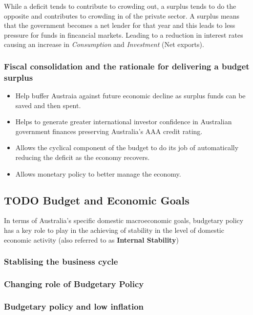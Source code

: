 \documentclass[11pt]{article}
\begin{document}
While a deficit tends to contribute to crowding out, a surplus tends
to do the opposite and contributes to crowding in of the private
sector. A surplus means that the government becomes a net lender for
that year and this leads to less pressure for funds in fincancial
markets. Leading to a reduction in interest rates causing an increase
in \emph{Consumption} and \emph{Investment} (Net exports).

\subsubsection{Fiscal consolidation and the rationale for delivering a budget surplus}
\label{sec-1-9-5}

\begin{itemize}
\item Help buffer Austraia against future economic decline as surplus
funds can be saved and then spent.
\item Helps to generate greater international investor confidence in
Australian government finances preserving Australia's AAA credit
rating.
\item Allows the cyclical component of the budget to do its job of
automatically reducing the deficit as the economy recovers.
\item Allows monetary policy to better manage the economy.
\end{itemize}

\subsection{{\bfseries\sffamily TODO} Budget and Economic Goals}
\label{sec-1-10}

In terms of Australia's specific domestic macroeconomic goals,
budgetary policy has a key role to play in the achieving of stability
in the level of domestic economic activity (also referred to as
\textbf{Internal Stability})

\subsubsection{Stablising the business cycle}
\label{sec-1-10-1}

\subsubsection{Changing role of Budgetary Policy}
\label{sec-1-10-2}

\subsubsection{Budgetary policy and low inflation}
\label{sec-1-10-3}
\end{document}
